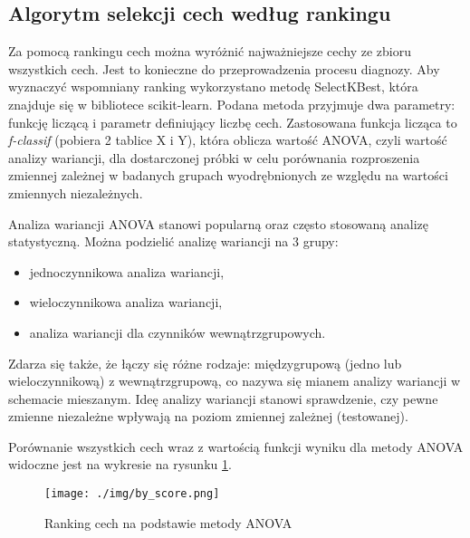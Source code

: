\subsection{Algorytm selekcji cech według rankingu}
Za pomocą rankingu cech można wyróżnić najważniejsze cechy ze zbioru wszystkich cech. Jest to konieczne do przeprowadzenia procesu diagnozy. Aby wyznaczyć wspomniany ranking wykorzystano metodę SelectKBest, która znajduje się w bibliotece scikit-learn. Podana metoda przyjmuje dwa parametry: funkcję liczącą i parametr definiujący liczbę cech. Zastosowana funkcja licząca to \emph {f-classif} (pobiera 2 tablice X i Y), która oblicza wartość ANOVA, czyli wartość analizy wariancji, dla dostarczonej próbki w celu porównania rozproszenia zmiennej zależnej w badanych grupach wyodrębnionych ze względu na wartości zmiennych niezależnych.

Analiza wariancji ANOVA stanowi popularną oraz często stosowaną analizę statystyczną. Można podzielić analizę wariancji na 3 grupy:

\begin{itemize}
    \item jednoczynnikowa analiza wariancji,
    \item wieloczynnikowa analiza wariancji,
    \item analiza wariancji dla czynników wewnątrzgrupowych.
\end{itemize}

Zdarza się także, że łączy się różne rodzaje: międzygrupową (jedno lub wieloczynnikową) z wewnątrzgrupową, co nazywa się mianem analizy wariancji w schemacie mieszanym. Ideę analizy wariancji stanowi sprawdzenie, czy pewne zmienne niezależne wpływają na poziom zmiennej zależnej (testowanej).

Porównanie wszystkich cech wraz z wartością funkcji wyniku dla metody ANOVA widoczne jest na wykresie na rysunku \ref{fig:by_score}.

\begin{figure}[h]
    \texttt{[image: ./img/by\_score.png]}
    \caption{Ranking cech na podstawie metody ANOVA} \label{fig:by_score}
\end{figure}

